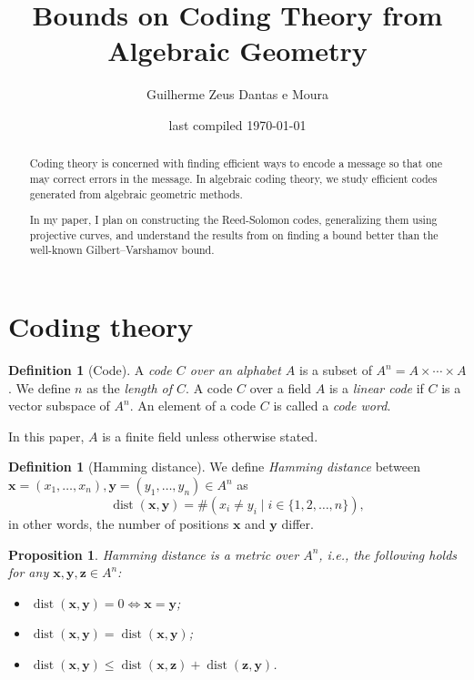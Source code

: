 \documentclass[11pt, letterpaper]{amsart}
\title{Bounds on Coding Theory from Algebraic Geometry}
\author{Guilherme Zeus Dantas e Moura}
\date{last compiled \today}
\newtheorem{prop}[thm]{Proposition}
\theoremstyle{definition}
\newtheorem{defn}[]{Definition}
\DeclareMathOperator{\dist}{dist}
\begin{document}
\begin{abstract}    
    Coding theory is concerned with finding efficient ways to encode a message so that one may correct errors in the message. In algebraic coding theory, we study efficient codes generated from algebraic geometric methods.
    
    In my paper, I plan on constructing the Reed-Solomon codes, generalizing them using projective curves, and understand the results from \cite{TVZ82} on finding a bound better than the well-known Gilbert--Varshamov bound.
\end{abstract} 

\maketitle

\section{Coding theory} \label{s:codingtheory}

\begin{defn}[Code]
    A \emph{code $C$ over an alphabet $A$} is a subset of $A^n = A \times \cdots \times A$.
    We define $n$ as the \emph{length of $C$}.
    A code $C$ over a field $A$ is a \emph{linear code} if $C$ is a vector subspace of $A^n$. An element of a code $C$ is called a \emph{code word}.
\end{defn}

In this paper, $A$ is a finite field unless otherwise stated.

\begin{defn}[Hamming distance]
    We define \emph{Hamming distance} between $\mathbf{x} = (x_1, \dots, x_n), \mathbf{y} = (y_1, \dots, y_n) \in A^n$ as
    \[ \dist(\mathbf{x}, \mathbf{y}) = \#\left( x_i \neq y_i \mid i \in \{1, 2, \dots, n\} \right),\]
    in other words, the number of positions $\mathbf{x}$ and $\mathbf{y}$ differ.
\end{defn}

\begin{prop}
    Hamming distance is a metric over $A^n$, i.e., the following holds for any $\mathbf{x}, \mathbf{y}, \mathbf{z} \in A^n$:
    \begin{itemize}[noitemsep]
        \item $\dist(\mathbf{x}, \mathbf{y}) = 0 \iff \mathbf{x} = \mathbf{y}$;
        \item $\dist(\mathbf{x}, \mathbf{y}) = \dist(\mathbf{x}, \mathbf{y})$;
        \item $\dist(\mathbf{x}, \mathbf{y}) \le \dist(\mathbf{x}, \mathbf{z}) + \dist(\mathbf{z}, \mathbf{y})$.
    \end{itemize}
\end{prop}
\end{document}

